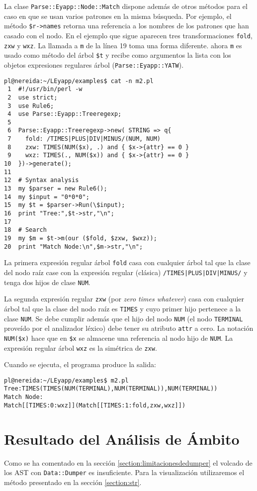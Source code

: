 La clase \verb|Parse::Eyapp::Node::Match| 
dispone además de otros métodos
para el caso en que se usan varios patrones en la misma búsqueda.
Por ejemplo, el método \verb|$r->names| retorna una referencia a los nombres de los patrones
que han casado con el nodo.
En el ejemplo que sigue aparecen tres transformaciones
\verb|fold|, \verb|zxw| y \verb|wxz|. La llamada a 
\verb|m| de la línea 19 toma una forma diferente. ahora
\verb|m| es usado como método del árbol \verb|$t| y recibe como argumentos
la lista con los objetos expresiones regulares árbol (\verb|Parse::Eyapp::YATW|).
\begin{verbatim}
pl@nereida:~/LEyapp/examples$ cat -n m2.pl
 1  #!/usr/bin/perl -w
 2  use strict;
 3  use Rule6;
 4  use Parse::Eyapp::Treeregexp;
 5
 6  Parse::Eyapp::Treeregexp->new( STRING => q{
 7    fold: /TIMES|PLUS|DIV|MINUS/(NUM, NUM)
 8    zxw: TIMES(NUM($x), .) and { $x->{attr} == 0 }
 9    wxz: TIMES(., NUM($x)) and { $x->{attr} == 0 }
10  })->generate();
11
12  # Syntax analysis
13  my $parser = new Rule6();
14  my $input = "0*0*0";
15  my $t = $parser->Run(\$input);
16  print "Tree:",$t->str,"\n";
17
18  # Search
19  my $m = $t->m(our ($fold, $zxw, $wxz));
20  print "Match Node:\n",$m->str,"\n";
\end{verbatim}
La primera expresión regular árbol \verb|fold| casa con cualquier árbol tal
que la clase del nodo raíz case con la expresión regular (clásica) 
\verb#/TIMES|PLUS|DIV|MINUS/# y tenga dos hijos de clase \verb|NUM|.

La segunda expresión regular \verb|zxw| (por \emph{zero
times whatever}) casa con cualquier árbol tal que la clase del 
nodo raíz es \verb|TIMES| y cuyo primer hijo pertenece a la clase
\verb|NUM|. Se debe cumplir además que el hijo del nodo \verb|NUM| 
(el nodo \verb|TERMINAL| proveído por el analizador léxico)
debe tener su atributo \verb|attr| a cero. La notación
\verb|NUM($x)| hace que en \verb|$x| se almacene una referencia al nodo
hijo de \verb|NUM|.
La expresión regular árbol \verb|wxz| es la simétrica de \verb|zxw|.

Cuando se ejecuta, el programa produce la salida:
\begin{verbatim}
pl@nereida:~/LEyapp/examples$ m2.pl
Tree:TIMES(TIMES(NUM(TERMINAL),NUM(TERMINAL)),NUM(TERMINAL))
Match Node:
Match[[TIMES:0:wxz]](Match[[TIMES:1:fold,zxw,wxz]])
\end{verbatim}

\section{Resultado del Análisis de Ámbito}
\label{section:resultadosambito}
Como se ha comentado en la sección 
\ref{section:limitacionesdedumper} el volcado de 
los AST con \verb|Data::Dumper| es insuficiente.
Para la visualización utilizaremos el método
 presentado en la sección
\ref{section:str}.

